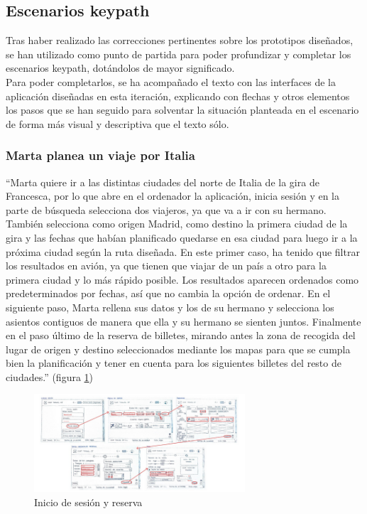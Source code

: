 \subsection{Escenarios keypath}
Tras haber realizado las correcciones pertinentes sobre los prototipos diseñados, se han utilizado como punto de partida para poder profundizar y completar los
escenarios keypath, dotándolos de mayor significado. \\

Para poder completarlos, se ha acompañado el texto con las interfaces de la aplicación diseñadas en esta iteración, explicando con flechas y otros elementos los pasos
que se han seguido para solventar la situación planteada en el escenario de forma más visual y descriptiva que el texto sólo.

\subsubsection{Marta planea un viaje por Italia}
“Marta quiere ir a las distintas ciudades del norte de Italia de la gira de Francesca, por lo que abre en el ordenador la aplicación, inicia sesión y en la parte de búsqueda selecciona dos viajeros, ya que va a ir con su hermano. También selecciona como origen Madrid, como destino la primera ciudad de la gira y las fechas que habían planificado quedarse en esa ciudad para luego ir a la próxima ciudad según la ruta diseñada. 
En este primer caso, ha tenido que filtrar los resultados en avión, ya que tienen que viajar de un país a otro para la primera ciudad y lo más rápido posible. Los resultados aparecen ordenados como predeterminados por fechas, así que no cambia la opción de ordenar. 
En el siguiente paso, Marta rellena sus datos y los de su hermano y selecciona los asientos contiguos de manera que ella y su hermano se sienten juntos.
Finalmente en el paso último de la reserva de billetes, mirando antes la zona de recogida del lugar de origen y destino seleccionados mediante los mapas para que se cumpla bien la planificación y tener en cuenta para los siguientes billetes del resto de ciudades.” (figura \ref{fig:Marta1})
\begin{figure}[h]
    \centering
    \includegraphics[width=0.7\textwidth]{Imagenes/Keypath/Marta1.png}
    \caption{Inicio de sesión y reserva}
    \label{fig:Marta1}
\end{figure}

